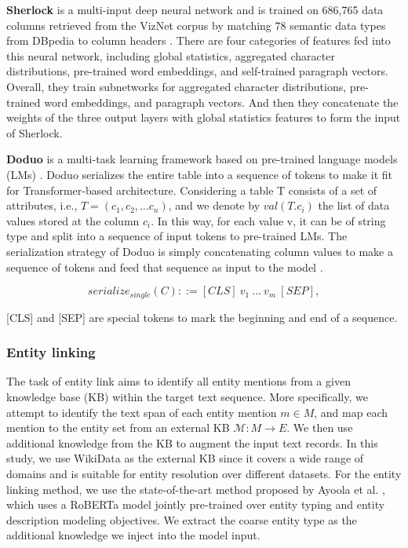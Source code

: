 \textbf{Sherlock} is a multi-input deep neural network and is trained on 686,765 data columns retrieved from the VizNet corpus by matching 78 semantic data types from DBpedia to column headers \cite{hulsebos_sherlock_2019}. There are four categories of features fed into this neural network, including global statistics, aggregated character distributions, pre-trained word embeddings, and self-trained paragraph vectors. Overall, they train subnetworks for aggregated character distributions, pre-trained word embeddings, and paragraph vectors. And then they concatenate the weights of the three output layers with global statistics features to form the input of Sherlock. 

\textbf{Doduo} is a multi-task learning framework based on pre-trained language models (LMs) \cite{suhara_annotating_2022}. Doduo serializes the entire table into a sequence of tokens to make it fit for Transformer-based architecture. Considering a table T consists of a set of attributes, i.e., $T= (c_1, c_2,... c_n)$, and we denote by  $val(T.c_i)$ the list of data values stored at the column $c_i$. In this way, for each value v, it can be of string type and split into a sequence of input tokens to pre-trained LMs. The serialization strategy of Doduo is simply concatenating column values to make a sequence of tokens and feed that sequence as input to the model \cite{suhara_annotating_2022}. 

\begin{equation}
    serialize_{single}(C) ::= [CLS]\ v_1\ ...\ v_m\ [SEP],
\end{equation}

[CLS] and [SEP] are special tokens to mark the beginning and end of a sequence. 


\subsubsection{Entity linking}
The task of entity link aims to identify all entity mentions from a given knowledge base (KB) within the target text sequence. More specifically, we attempt to identify the text span of each entity mention $m \in M$, and map each mention to the entity set from an external KB $\mathcal{M}: M \rightarrow E$. 
We then use additional knowledge from the KB to augment the input text records.
In this study, we use WikiData as the external KB since it covers a wide range of domains and is suitable for entity resolution over different datasets. For the entity linking method, we use the state-of-the-art method proposed by Ayoola et al. \cite{ayoola_refined_2022}, which uses a RoBERTa model jointly pre-trained over entity typing and entity description modeling objectives. We extract the coarse entity type as the additional knowledge we inject into the model input.

